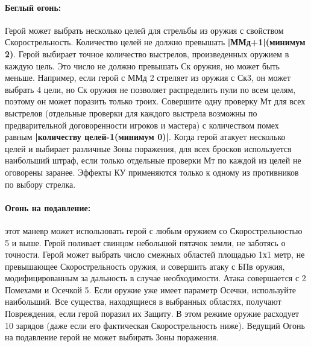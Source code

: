 \paragraph{Беглый огонь:} Герой может выбрать несколько целей для стрельбы из оружия с свойством Скорострельность. Количество целей не должно превышать \textbf{|ММд+1|(минимум 2)}. Герой выбирает точное количество выстрелов, произведенных оружием в каждую цель. Это число не должно превышать Ск оружия, но может быть меньше. Например, если герой с ММд 2 стреляет из оружия с Ск3, он может выбрать 4 цели, но Ск оружия не позволяет распределить пули по всем целям, поэтому он может поразить только троих.
\newline
Совершите одну проверку Мт для всех выстрелов (отдельные проверки для каждого выстрела возможны по предварительной договоренности игроков и мастера) с количеством помех равным \textbf{|количеству целей-1(минимум 0)|}. Когда герой атакует несколько целей и выбирает различные Зоны поражения, для всех бросков используется наибольший штраф, если только отдельные проверки Мт по каждой из целей не оговорены заранее.
\newline
Эффекты КУ применяются только к одному из противников по выбору стрелка.
\paragraph{Огонь на подавление:} этот маневр может использовать герой с любым оружием со Скорострельностью 5 и выше. Герой поливает свинцом небольшой пятачок земли, не заботясь о точности. Герой может выбрать число смежных областей площадью 1х1 метр, не превышающее Скорострельность оружия, и совершить атаку с БПв оружия, модифицированным за дальность в случае необходимости. Атака совершается с 2 Помехами и Осечкой 5. Если оружие уже имеет параметр Осечки, используйте наибольший. Все существа, находящиеся в выбранных областях, получают Повреждения, если герой поразил их Защиту. В этом режиме оружие расходует 10 зарядов (даже если его фактическая Скорострельность ниже). Ведущий Огонь на подавление герой не может выбирать Зоны поражения.